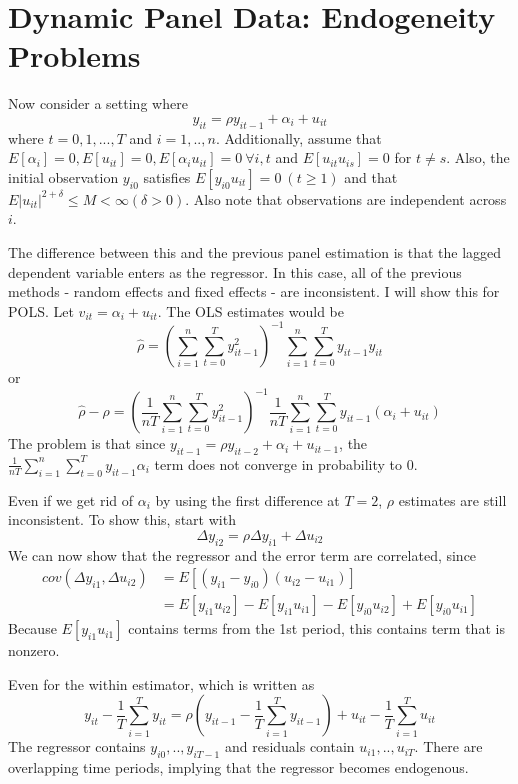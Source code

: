 \section{Dynamic Panel Data: Endogeneity Problems}
Now consider a setting where
\[
y_{it}=\rho y_{it-1}+\alpha_i +u_{it}
\]
where $t=0,1,...,T$ and $i=1,..,n$. Additionally, assume that $E[\alpha_i]=0, E[u_{it}]=0, E[\alpha_i u_{it}]=0 \ \forall i,t$ and $E[u_{it}u_{is}]=0$ for $t\neq s$. Also, the initial observation $y_{i0}$ satisfies $E[y_{i0}u_{it}]=0\ (t\geq1)$ and that $E|u_{it}|^{2+\delta}\leq M <\infty (\delta>0)$. Also note that observations are independent across $i$. \par
The difference between this and the previous panel estimation is that the lagged dependent variable enters as the regressor. In this case, all of the previous methods - random effects and fixed effects - are inconsistent. I will show this for POLS. Let $v_{it}=\alpha_i + u_{it}$. The OLS estimates would be
\small{\[
\hat{\rho}=\left(\sum_{i=1}^n \sum_{t=0}^Ty_{it-1}^2 \right)^{-1}\sum_{i=1}^n \sum_{t=0}^Ty_{it-1}y_{it}
\]}\normalsize
or
\small{\[
\hat{\rho}-\rho = \left(\frac{1}{nT}\sum_{i=1}^n \sum_{t=0}^Ty_{it-1}^2 \right)^{-1}\frac{1}{nT}\sum_{i=1}^n \sum_{t=0}^Ty_{it-1}(\alpha_i + u_{it})
\]}\normalsize
The problem is that since $y_{it-1}= \rho y_{it-2}+\alpha_i + u_{it-1}$, the $\frac{1}{nT}\sum_{i=1}^n \sum_{t=0}^Ty_{it-1}\alpha_i$ term does not converge in probability to 0.\par
Even if we get rid of $\alpha_i$ by using the first difference at $T=2$, $\rho$ estimates are still inconsistent. To show this, start with
\[
\Delta y_{i2}=\rho\Delta y_{i1}+\Delta u_{i2}
\]
We can now show that the regressor and the error term are correlated, since
\begin{align*}
cov(\Delta y_{i1}, \Delta u_{i2})&=E[(y_{i1}-y_{i0})(u_{i2}-u_{i1})]\\
 &=E[y_{i1}u_{i2}]-E[y_{i1}u_{i1}]-E[y_{i0}u_{i2}]+E[y_{i0}u_{i1}]
\end{align*}
Because $E[y_{i1}u_{i1}]$ contains terms from the 1st period, this contains term that is nonzero. \par
Even for the within estimator, which is written as
\[
y_{it}-\frac{1}{T}\sum_{i=1}^Ty_{it}=\rho\left(y_{it-1}-\frac{1}{T}\sum_{i=1}^Ty_{it-1}\right)+u_{it}-\frac{1}{T}\sum_{i=1}^Tu_{it}
\]
The regressor contains $y_{i0},..,y_{iT-1}$ and residuals contain $u_{i1},..,u_{iT}$. There are overlapping time periods, implying that the regressor becomes endogenous.
